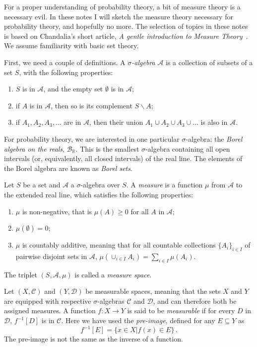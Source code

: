 For a proper understanding of probability theory, a bit of measure theory is a necessary evil. In these notes I will sketch the measure theory necessary for probability theory, and hopefully no more. The selection of topics in these notes is based on Chandalia's short article, \emph{A gentle introduction to Measure Theory}~\cite{chandalia_measure_theory_2007}. We assume familiarity with basic set theory.

First, we need a couple of definitions. A \emph{$\sigma$-algebra} $\mathcal{A}$ is a collection of subsets of a set $S$, with the following properties:
\begin{enumerate}
\item $S$ is in $\mathcal{A}$, and the empty set $\emptyset$ is in $\mathcal{A}$;
\item if $A$ is in $\mathcal{A}$, then so is its complement $S \backslash A$;
\item if $A_1, A_2, A_3, \ldots$ are in $\mathcal{A}$, then their union $A_1 \cup A_2 \cup A_3 \cup \ldots$ is also in $\mathcal{A}$.
\end{enumerate}
For probability theory, we are interested in one particular $\sigma$-algebra: the \emph{Borel algebra on the reals}, $\mathcal{B}_\mathbb{R}$. This is the smallest $\sigma$-algebra containing all open intervals (or, equivalently, all closed intervals) of the real line. The elements of the Borel algebra are known as \emph{Borel sets}.

Let $S$ be a set and $\mathcal{A}$ a $\sigma$-algebra over $S$. A \emph{measure} is a function $\mu$ from $\mathcal{A}$ to the extended real line, which satisfies the following properties:
\begin{enumerate}
\item $\mu$ is non-negative, that is $\mu(A) \geq 0$ for all $A$ in $\mathcal{A}$;
\item $\mu(\emptyset) = 0$;
\item $\mu$ is countably additive, meaning that for all countable collections ${\{A_i\}}_{i \in I}$ of pairwise disjoint sets in $\mathcal{A}$, $\mu \left( \cup_{i \in I} A_i \right) = \sum_{i \in I} \mu(A_i)$.
\end{enumerate}
The triplet $(S, \mathcal{A}, \mu)$ is called a \emph{measure space}.

Let $(X, \mathcal{C})$ and $(Y, \mathcal{D})$ be measurable spaces, meaning that the sets $X$ and $Y$ are equipped with respective $\sigma$-algebras $\mathcal{C}$ and $\mathcal{D}$, and can therefore both be assigned measures. A function $f \colon X \to Y$ is said to be \emph{measurable} if for every $D$ in $\mathcal{D}$, $f^{-1}[D]$ is in $\mathcal{C}$. Here we have used the \emph{pre-image}, defined for any $E \subseteq Y$ as
\begin{equation}
  \label{eq:1}
  f^{-1}[E] = \{ x \in X | f(x) \in E \} \,.
\end{equation}
The pre-image is not the same as the inverse of a function.

